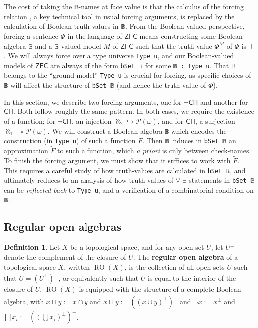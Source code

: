 \documentclass[sigplan,10pt,review, anonymous]{acmart}
\newcommand{\lil}{\lstinline}
\newcommand{\ZFC}{\mathsf{ZFC}}
\newcommand{\CH}{\mathsf{CH}}
\theoremstyle{definition}
\newtheorem{defn}{Definition}[section]
\begin{document}
The cost of taking the \lstinline{𝔹}-names at face value is that the calculus of the forcing relation \cite{shoenfield1971unramified}, a key technical tool in usual forcing arguments, is replaced by the calculation of Boolean truth-values in \lstinline{𝔹}.
From the Boolean-valued perspective, forcing a sentence \(\Phi\) in the language of \(\ZFC\) means constructing some Boolean algebra \lil{𝔹} and a \lil{𝔹}-valued model \(M\) of \(\ZFC\) such that the truth value \(\Phi^{M}\) of \(\Phi\) is \(\top\).
We will always force over a type universe \lil{Type u}, and our Boolean-valued models of \(\ZFC\) are always of the form \lil{bSet 𝔹} for some \lil{𝔹 : Type u}.
That \lil{𝔹} belongs to the ``ground model'' \lil{Type u} is crucial for forcing, as specific choices of \lil{𝔹} will affect the structure of \lil{bSet 𝔹} (and hence the truth-value of \(\Phi\)). %

In this section, we describe two forcing arguments, one for \(\neg \CH\) and another for \(\CH\).
Both follow roughly the same pattern. In both cases, we require the existence of a function; for \(\neg \CH\), an injection \(\aleph_2 \hookrightarrow \mathcal{P}(\omega)\), and for \(\CH\), a surjection \(\aleph_1 \twoheadrightarrow \mathcal{P}(\omega)\).
We will construct a Boolean algebra \lil{𝔹} which encodes the construction (in \lil{Type u}) of such a function \(F\).
Then \lil{𝔹} induces in \lil{bSet 𝔹} an approximation \(\widetilde{F}\) to such a function, which \emph{a priori} is only between check-names.
To finish the forcing argument, we must show that it suffices to work with \(\widetilde{F}\).
This requires a careful study of how truth-values are calculated in \lil{bSet 𝔹},
and ultimately reduces to an analysis of how truth-values of \(\forall\)-\(\exists\) statements in \lil{bSet 𝔹} can be \emph{reflected back} to \lil{Type u}, and a verification of a combinatorial condition on \lil{𝔹}.

\subsection{Regular open algebras}
\begin{defn}\label{def:regular-open-algebra}
  Let $X$ be a topological space, and for any open set $U$, let $U^{\perp}$ denote the complement of the closure of $U$.
  The \textbf{regular open algebra} of a topological space $X$, written $\operatorname{RO}(X)$, is the collection of all open sets $U$ such that $U = (U^\perp)^\perp$, or equivalently such that
  $U$ is equal to the interior of the closure of $U$.
  $\operatorname{RO}(X)$ is equipped with the structure of a complete Boolean algebra, with $x \sqcap y := x \cap y$ and $x \sqcup y := ((x \cup y)^\perp)^\perp$ and $\neg x := x^\perp$ and $\bigsqcup x_i := ((\bigcup x_i)^\perp)^\perp$.
\end{defn}
\end{document}
